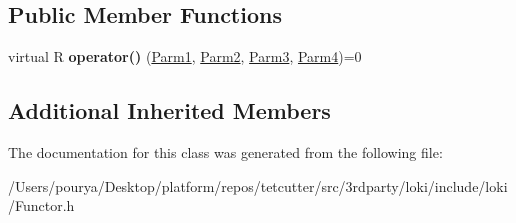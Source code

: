 \subsection*{Public Member Functions}
\begin{DoxyCompactItemize}
\item 
\hypertarget{classLoki_1_1FunctorImpl_3_01R_00_01Seq_3_01P1_00_01P2_00_01P3_00_01P4_01_4_00_01ThreadingModel_01_4_afc7dbc826b8bb6acd41f9e9e11b38a07}{}virtual R {\bfseries operator()} (\hyperlink{classLoki_1_1EmptyType}{Parm1}, \hyperlink{classLoki_1_1EmptyType}{Parm2}, \hyperlink{classLoki_1_1EmptyType}{Parm3}, \hyperlink{classLoki_1_1EmptyType}{Parm4})=0\label{classLoki_1_1FunctorImpl_3_01R_00_01Seq_3_01P1_00_01P2_00_01P3_00_01P4_01_4_00_01ThreadingModel_01_4_afc7dbc826b8bb6acd41f9e9e11b38a07}

\end{DoxyCompactItemize}
\subsection*{Additional Inherited Members}


The documentation for this class was generated from the following file\+:\begin{DoxyCompactItemize}
\item 
/\+Users/pourya/\+Desktop/platform/repos/tetcutter/src/3rdparty/loki/include/loki/Functor.\+h\end{DoxyCompactItemize}

